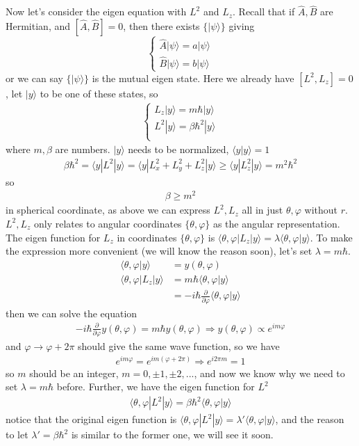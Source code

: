 \documentclass[UTF8,12pt]{article} %
\begin{document}
Now let's consider the eigen equation with $L^{2}$ and $L_{z}$. Recall that if $\hat{A}, \hat{B}$ are Hermitian, and $[\hat{A}, \hat{B}] = 0$, then there exists $\{|\psi\rangle\}$ giving
$$\begin{cases}\hat{A}|\psi\rangle = a|\psi\rangle \\ \hat{B}|\psi\rangle = b|\psi\rangle\end{cases}$$
or we can say $\{|\psi\rangle\}$ is the mutual eigen state. Here we already have $[L^{2}, L_{z}] = 0$, let $|y\rangle$ to be one of these states, so
\begin{align}
\begin{cases}
L_{z}|y\rangle = m\hbar|y\rangle \\
L^{2}|y\rangle = \beta\hbar^{2}|y\rangle \\
\end{cases}
\end{align}
where $m,\beta$ are numbers. $|y\rangle$ needs to be normalized, $\langle y|y\rangle = 1$
\begin{align}
\beta\hbar^{2} = \langle y|L^{2}|y\rangle = \langle y|L_{x}^{2} + L_{y}^{2} + L_{z}^{2}|y\rangle \ge \langle y|L_{z}^{2}|y\rangle = m^{2}\hbar^{2}
\end{align}
so
\begin{align}
\beta \ge m^{2}
\end{align}
    in spherical coordinate, as above we can express $L^{2}, L_{z}$ all in just $\theta, \varphi$ without $r$. $L^{2}, L_{z}$ only relates to angular coordinates $\{\theta, \varphi\}$ as the angular representation. The eigen function for $L_{z}$ in coordinates $\{\theta, \varphi\}$ is $\langle\theta,\varphi|L_{z}|y\rangle = \lambda\langle\theta,\varphi|y\rangle$. To make the expression more convenient (we will know the reason soon), let's set $\lambda = m\hbar$.
\begin{align}
\langle\theta, \varphi|y\rangle &= y(\theta, \varphi) \\
\langle\theta,\varphi|L_{z}|y\rangle &= m\hbar\langle\theta,\varphi|y\rangle \\
&= -i\hbar\frac{\partial}{\partial\varphi}\langle\theta,\varphi|y\rangle
\end{align}
then we can solve the equation
\begin{align}
-i\hbar\frac{\partial}{\partial\varphi} y(\theta,\varphi) = m\hbar y(\theta,\varphi) \Rightarrow y(\theta,\varphi) \propto e^{im\varphi}
\end{align}
and $\varphi \rightarrow \varphi + 2\pi$ should give the same wave function, so we have
\begin{align}
e^{im\varphi} = e^{im(\varphi + 2\pi)} \Rightarrow e^{i2\pi m} = 1
\end{align}
so $m$ should be an integer, $m = 0, \pm1, \pm2, ...$, and now we know why we need to set $\lambda = m\hbar$ before. Further, we have the eigen function for $L^{2}$
\begin{align}
\langle\theta, \varphi|L^{2}|y\rangle = \beta\hbar^{2}\langle\theta,\varphi|y\rangle
\end{align}
notice that the original eigen function is $\langle\theta, \varphi|L^{2}|y\rangle = \lambda'\langle\theta,\varphi|y\rangle$, and the reason to let $\lambda' = \beta\hbar^{2}$ is similar to the former one, we will see it soon.
\end{document}
